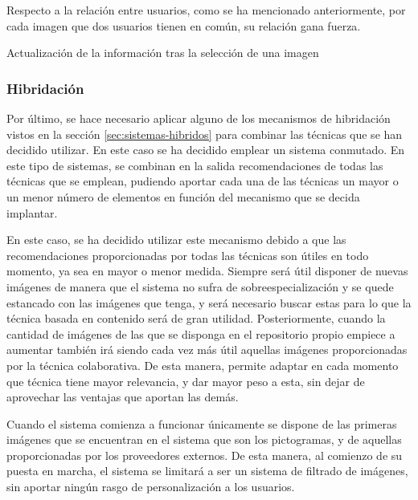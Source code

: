 Respecto a la relación entre usuarios, como se ha mencionado anteriormente, por cada imagen que dos usuarios tienen en común, su relación gana fuerza. 


\newpage




Actualización de la información tras la selección de una imagen
\subsubsection{Hibridación}


Por último, se hace necesario aplicar alguno de los mecanismos de hibridación vistos en la sección \ref{sec:sistemas-hibridos} para combinar las técnicas que se han decidido utilizar. En este caso se ha decidido emplear un sistema conmutado. En este tipo de sistemas, se combinan en la salida recomendaciones de todas las técnicas que se emplean, pudiendo aportar cada una de las técnicas un mayor o un menor número de elementos en función del mecanismo que se decida implantar.

En este caso, se ha decidido utilizar este mecanismo debido a que las recomendaciones proporcionadas por todas las técnicas son útiles en todo momento, ya sea en mayor o menor medida. Siempre será útil disponer de nuevas imágenes de manera que el sistema no sufra de sobreespecialización y se quede estancado con las imágenes que tenga, y será necesario buscar estas para lo que la técnica basada en contenido será de gran utilidad. Posteriormente, cuando la cantidad de imágenes de las que se disponga en el repositorio propio empiece a aumentar también irá siendo cada vez más útil aquellas imágenes proporcionadas por la técnica colaborativa. De esta manera, permite adaptar en cada momento que técnica tiene mayor relevancia, y dar mayor peso a esta, sin dejar de aprovechar las ventajas que aportan las demás. 

Cuando el sistema comienza a funcionar únicamente se dispone de las primeras imágenes que se encuentran en el sistema que son los pictogramas, y de aquellas proporcionadas por los proveedores externos. De esta manera, al comienzo de su puesta en marcha, el sistema se limitará a ser un sistema de filtrado de imágenes, sin aportar ningún rasgo de personalización a los usuarios.

